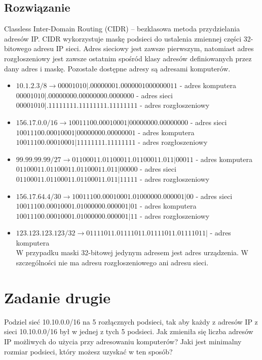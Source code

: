 \documentclass[a4paper]{article}
\begin{document}
\subsection{Rozwiązanie}
Classless Inter-Domain Routing (CIDR) – bezklasowa metoda przydzielania adresów IP. CIDR wykorzystuje maskę podsieci do ustalenia zmiennej części 32-bitowego adresu IP sieci. Adres sieciowy jest zawsze pierwszym, natomiast adres rozgłoszeniowy jest zawsze ostatnim spośród klasy adresów definiowanych przez dany adres i maskę. Pozostałe dostępne adresy są adresami komputerów.
\begin{itemize}
\item $10.1.2.3/8\rightarrow00001010|.00000001.0000001000000011$ - adres komputera\\
$00001010|.00000000.00000000.0000000$ - adres sieci\\
$00001010|.11111111.11111111.11111111$ - adres rozgłoszeniowy
\item $156.17.0.0/16\rightarrow10011100.00010001|00000000.00000000$ - adres sieci\\
$10011100.00010001|00000000.00000001$ - adres komputera\\
$10011100.00010001|11111111.11111111$ - adres rozgłoszeniowy
\item $99.99.99.99/27\rightarrow01100011.01100011.01100011.011|00011$ - adres komputera\\
$01100011.01100011.01100011.011|00000$ - adres sieci\\
$01100011.01100011.01100011.011|11111$ - adres rozgłoszeniowy
\item $156.17.64.4/30\rightarrow10011100.00010001.01000000.000001|00$ - adres sieci\\
$10011100.00010001.01000000.000001|01$ - adres komputera\\
$10011100.00010001.01000000.000001|11$ - adres rozgłoszeniowy
\item $123.123.123.123/32\rightarrow01111011.01111011.01111011.01111011|$ - adres komputera\\
W przypadku maski 32-bitowej jedynym adresem jest adres urządzenia. W szczególności nie ma adresu rozgłoszeniowego ani adresu sieci.
\end{itemize}


\section{Zadanie drugie}
Podziel sieć 10.10.0.0/16 na 5 rozłącznych podsieci, tak aby każdy z adresów IP z sieci 10.10.0.0/16 był w jednej z tych 5 podsieci. Jak zmieniła się liczba adresów IP możliwych do użycia przy adresowaniu komputerów? Jaki jest minimalny rozmiar podsieci, który możesz uzyskać w ten sposób?
\end{document}
